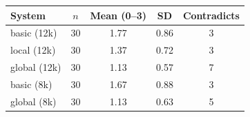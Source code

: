 \begin{tabular}{lcccc}
\toprule
System & $n$ & Mean (0--3) & SD & Contradicts \\
\midrule
basic (12k) & 30 & 1.77 & 0.86 & 3 \\
local (12k) & 30 & 1.37 & 0.72 & 3 \\
global (12k) & 30 & 1.13 & 0.57 & 7 \\
basic (8k) & 30 & 1.67 & 0.88 & 3 \\
global (8k) & 30 & 1.13 & 0.63 & 5 \\
\bottomrule
\end{tabular}
